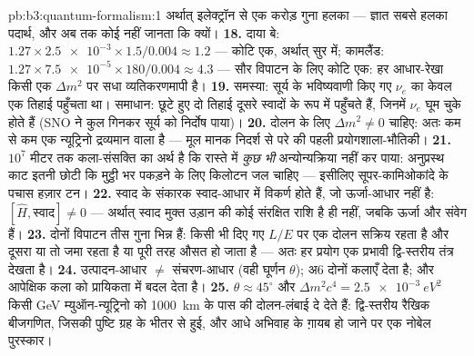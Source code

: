 \begin{solution}{pb:b3:quantum-formalism:1}
अर्थात् इलेक्ट्रॉन से एक करोड़ गुना हलका --- ज्ञात सबसे हलका पदार्थ,
और अब तक कोई नहीं जानता कि क्यों।
\textbf{18.} दाया बे: $1.27 \times \num{2.5e-3} \times 1.5/0.004
\approx 1.2$ --- कोटि एक, अर्थात् सुर में; कामलैंड: $1.27 \times
\num{7.5e-5} \times 180/0.004 \approx 4.3$ --- सौर विपाटन के लिए
कोटि एक: हर आधार-रेखा किसी एक $\Delta m^2$ पर सधा व्यतिकरणमापी है।
\textbf{19.} समस्या: सूर्य के भविष्यवाणी किए गए $\nu_e$ का केवल एक
तिहाई पहुँचता था। समाधान: छूटे हुए दो तिहाई दूसरे
स्वादों के रूप में पहुँचते हैं, जिनमें $\nu_e$ घूम चुके होते हैं (SNO ने
कुल गिनकर सूर्य को निर्दोष पाया)।
\textbf{20.} दोलन के लिए $\Delta m^2 \neq 0$ चाहिए: अतः कम से कम एक
न्यूट्रिनो द्रव्यमान वाला है --- मूल मानक निदर्श से परे की पहली
प्रयोगशाला-भौतिकी।
\textbf{21.} $10^7$ मीटर तक कला-संसक्ति का अर्थ है कि रास्ते में
\emph{कुछ भी} अन्योन्यक्रिया नहीं कर पाया: अनुप्रस्थ काट इतनी छोटी कि
मुट्ठी भर पकड़ने के लिए किलोटन जल चाहिए --- इसीलिए
सूपर-कामिओकांदे के पचास हज़ार टन।
\textbf{22.} स्वाद के संकारक स्वाद-आधार में विकर्ण होते हैं,
जो ऊर्जा-आधार नहीं है: $[\hat H, \text{स्वाद}] \neq 0$ ---
अर्थात् स्वाद मुक्त उड़ान की कोई संरक्षित राशि है ही नहीं, जबकि
ऊर्जा और संवेग हैं।
\textbf{23.} दोनों विपाटन तीस गुना भिन्न हैं: किसी भी दिए गए
$L/E$ पर एक दोलन सक्रिय रहता है और दूसरा या तो जमा रहता है या पूरी तरह
औसत हो जाता है --- अतः हर प्रयोग एक प्रभावी द्वि-स्तरीय तंत्र देखता है।
\textbf{24.} उत्पादन-आधार $\neq$ संचरण-आधार (वही
घूर्णन $\theta$); अ6 दोनों कलाएँ देता है; और 
आपेक्षिक कला को प्रायिकता में बदल देता है।
\textbf{25.} $\theta \approx 45^\circ$ और $\Delta m^2c^4 =
\qty{2.5e-3}{eV^2}$ किसी GeV म्युऑन-न्यूट्रिनो को
\qty{1000}{km} के पास की दोलन-लंबाई दे देते हैं: द्वि-स्तरीय रैखिक
बीजगणित, जिसकी पुष्टि ग्रह के भीतर से हुई, और आधे अभिवाह के ग़ायब हो
जाने पर एक नोबेल पुरस्कार।
\end{solution}
